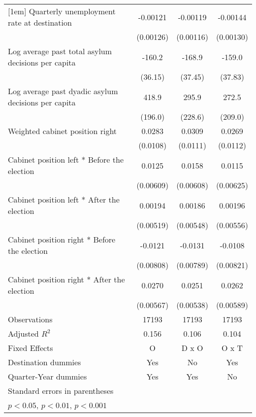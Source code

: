 \begin{table}[htbp]
\begin{tabular}{l*{3}{c}}
[1em]
Quarterly unemployment rate at destination&    -0.00121         &    -0.00119         &    -0.00144         \\
                    &   (0.00126)         &   (0.00116)         &   (0.00130)         \\
[1em]
Log average past total asylum decisions per capita&      -160.2\sym{***}&      -168.9\sym{***}&      -159.0\sym{***}\\
                    &     (36.15)         &     (37.45)         &     (37.83)         \\
[1em]
Log average past dyadic asylum decisions per capita&       418.9\sym{*}  &       295.9         &       272.5         \\
                    &     (196.0)         &     (228.6)         &     (209.0)         \\
[1em]
Weighted cabinet position right&      0.0283\sym{*}  &      0.0309\sym{**} &      0.0269\sym{*}  \\
                    &    (0.0108)         &    (0.0111)         &    (0.0112)         \\
[1em]
Cabinet position left * Before the election&      0.0125\sym{*}  &      0.0158\sym{*}  &      0.0115         \\
                    &   (0.00609)         &   (0.00608)         &   (0.00625)         \\
[1em]
Cabinet position left * After the election&     0.00194         &     0.00186         &     0.00196         \\
                    &   (0.00519)         &   (0.00548)         &   (0.00556)         \\
[1em]
Cabinet position right * Before the election&     -0.0121         &     -0.0131         &     -0.0108         \\
                    &   (0.00808)         &   (0.00789)         &   (0.00821)         \\
[1em]
Cabinet position right * After the election&      0.0270\sym{***}&      0.0251\sym{***}&      0.0262\sym{***}\\
                    &   (0.00567)         &   (0.00538)         &   (0.00589)         \\
\hline
Observations        &       17193         &       17193         &       17193         \\
Adjusted \(R^{2}\)  &       0.156         &       0.106         &       0.104         \\
Fixed Effects       &           O         &       D x O         &       O x T         \\
Destination dummies &         Yes         &          No         &         Yes         \\
Quarter-Year dummies&         Yes         &         Yes         &          No         \\
\hline\hline
\multicolumn{4}{l}{\footnotesize Standard errors in parentheses}\\
\multicolumn{4}{l}{\footnotesize \sym{*} \(p<0.05\), \sym{**} \(p<0.01\), \sym{***} \(p<0.001\)}\\
\end{tabular}
\end{table}
